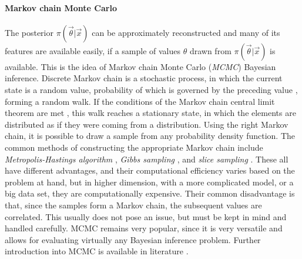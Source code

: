 \paragraph{Markov chain Monte Carlo}
The posterior $\pi(\vec{\theta}|\vec{x})$ can be approximately reconstructed and many of its features are available easily, if a sample of values $\theta$ drawn from $\pi(\vec{\theta}|\vec{x})$ is available. This is the idea of Markov chain Monte Carlo (\textit{MCMC}) Bayesian inference. Discrete Markov chain is a stochastic process, in which the current state is a random value, probability of which is governed by the preceding value \citep{markov1906extension}, forming a random walk. If the conditions of the Markov chain central limit theorem are met \citep{jones2004markov}, this walk reaches a stationary state, in which the elements are distributed as if they were coming from a distribution. Using the right Markov chain, it is possible to draw a sample from any probability density function. The common methods of constructing the appropriate Markov chain include \textit{Metropolis-Hastings algorithm} \citep{metropolis1953equation,hastings1970monte}, \textit{Gibbs sampling} \citep{geman1984stochastic}, and \textit{slice sampling} \citep{damlen1999gibbs}. These all have different advantages, and their computational efficiency varies based on the problem at hand, but in higher dimension, with a more complicated model, or a big data set, they are computationally expensive. Their common disadvantage is that, since the samples form a Markov chain, the subsequent values are correlated. This usually does not pose an issue, but must be kept in mind and handled carefully. MCMC remains very popular, since it is very versatile and allows for evaluating virtually any Bayesian inference problem. Further introduction into MCMC is available in literature \citep{brooks2011handbook}. 

